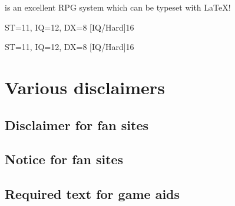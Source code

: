 \documentclass{article}
\begin{document}
\gurps is an excellent RPG system which can be typeset with \LaTeX{}!

\begin{character}{ST=11, IQ=12, DX=8}
  [IQ/Hard]{16}
\end{character}

\begin{lens}{ST=11, IQ=12, DX=8}
  [IQ/Hard]{16}
\end{lens}

\section{Various disclaimers}
\label{sec:various-disclaimers}

\subsection{Disclaimer for fan sites}
\label{sec:disclaimer-fan-sites}

\SJGamesOnlinePolicyDisclaimer

\subsection{Notice for fan sites}
\label{sec:disclaimer-fan-sites}

\SJGamesOnlinePolicyNotice

\subsection{Required text for game aids}
\label{sec:disclaimer-fan-sites}

\end{document}
